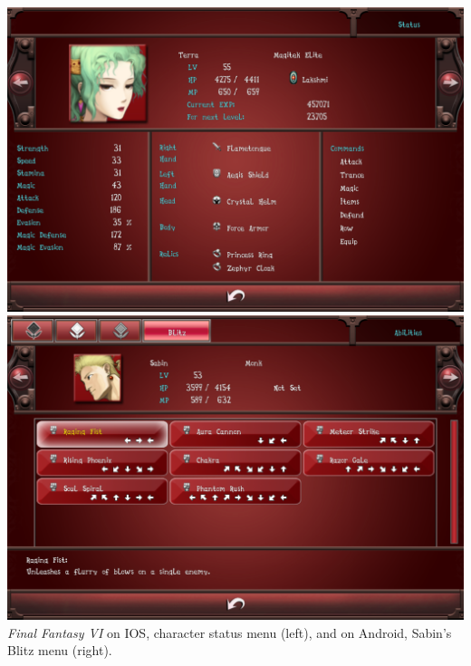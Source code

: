 \documentclass{scrartcl}
\begin{document}
{\includegraphics[scale = 0.12]{FFVI_iOS_Status_Menu}
\includegraphics[scale = 0.12]{FFVI_Android_Blitz_Menu}{
    \emph{Final Fantasy VI} on IOS, character status menu (left), and on Android, Sabin's Blitz menu (right).\\
}

}
\end{document}
